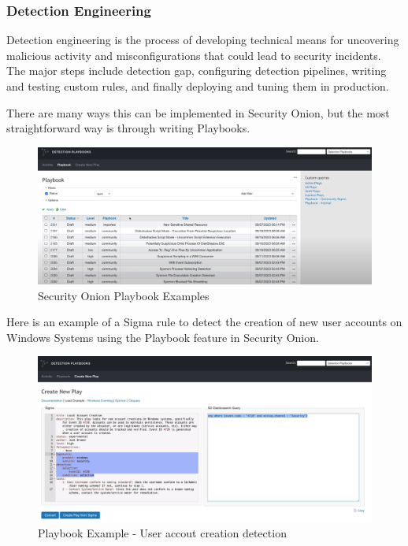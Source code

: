 \subsubsection{Detection Engineering}
Detection engineering is the process of developing technical means for uncovering malicious activity and misconfigurations that could lead to security incidents.
The major steps include detection gap, configuring detection pipelines, writing and testing custom rules, and finally deploying and tuning them in production.

There are many ways this can be implemented in Security Onion, but the most straightforward way is through writing Playbooks.

\begin{figure}[H]
    \centering
    \includegraphics[width=1\textwidth]{src/assets/images/security-onion-playbooks.png}
    \caption{Security Onion Playbook Examples}
\end{figure}

Here is an example of a Sigma rule to detect the creation of new user accounts on Windows Systems using the Playbook feature in Security Onion.

\begin{figure}[H]
    \centering
    \includegraphics[width=1\textwidth]{src/assets/images/security-onion-sigma-rule.png}
    \caption{Playbook Example - User accout creation detection}
\end{figure}

